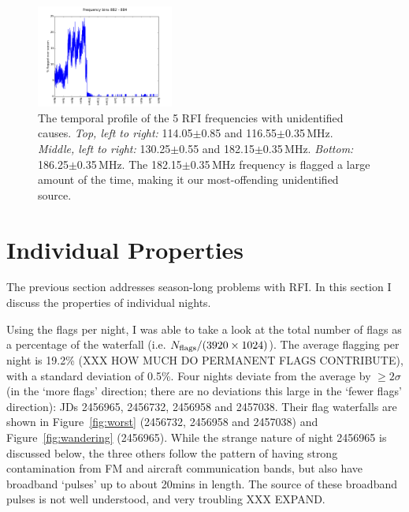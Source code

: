 \documentclass[10pt,a4paper]{article}
\begin{document}
\begin{figure}
\includegraphics[width=0.4\textwidth]{RFI-images/FB_882_884.png}
\caption{The temporal profile of the 5 RFI frequencies with unidentified causes. \textit{Top, left to right:} 114.05$\pm$0.85 and 116.55$\pm$0.35\,MHz. \textit{Middle, left to right:} 130.25$\pm$0.55 and 182.15$\pm$0.35\,MHz. \textit{Bottom:} 186.25$\pm$0.35\,MHz. The 182.15$\pm$0.35\,MHz frequency is flagged a large amount of the time, making it our most-offending unidentified source.}
\label{fig:unidentified}
\end{figure}


\section{Individual Properties}

The previous section addresses season-long problems with RFI. In this section I discuss the properties of individual nights.

Using the flags per night, I was able to take a look at the total number of flags as a percentage of the waterfall (i.e. $N_{\rm flags}/(3920\times1024)$). The average flagging per night is 19.2\% (XXX HOW MUCH DO PERMANENT FLAGS CONTRIBUTE), with a standard deviation of 0.5\%. Four nights deviate from the average by $\geq 2\sigma$ (in the `more flags' direction; there are no deviations this large in the `fewer flags' direction): JDs 2456965, 2456732, 2456958 and 2457038. Their flag waterfalls are shown in Figure~\ref{fig:worst} (2456732, 2456958 and 2457038) and Figure~\ref{fig:wandering} (2456965). While the strange nature of night 2456965 is discussed below, the three others follow the pattern of having strong contamination from FM and aircraft communication bands, but also have broadband `pulses' up to about 20mins in length. The source of these broadband pulses is not well understood, and very troubling XXX EXPAND.
\end{document}

